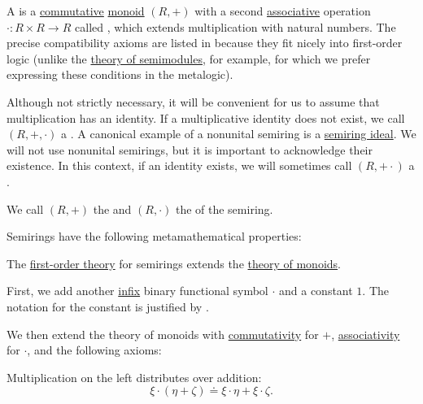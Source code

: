 \begin{definition}\label{def:semiring}
  A  is a \hyperref[def:magma/commutative]{commutative} \hyperref[def:monoid]{monoid} \( (R, +) \) with a second \hyperref[def:magma/associative]{associative} operation \( \cdot: R \times R \to R \) called , which extends multiplication with natural numbers. The precise compatibility axioms are listed in  because they fit nicely into first-order logic (unlike the \hyperref[def:semimodule/theory]{theory of semimodules}, for example, for which we prefer expressing these conditions in the metalogic).

  Although not strictly necessary, it will be convenient for us to assume that multiplication has an identity. If a multiplicative identity does not exist, we call \( (R, +, \cdot) \) a . A canonical example of a nonunital semiring is a \hyperref[def:semiring_ideal]{semiring ideal}. We will not use nonunital semirings, but it is important to acknowledge their existence. In this context, if an identity exists, we will sometimes call \( (R, + \cdot) \) a .

  We call \( (R, +) \) the  and \( (R, \cdot) \) the  of the semiring.

  Semirings have the following metamathematical properties:
  \begin{thmenum}
     The \hyperref[def:first_order_theory]{first-order theory} for semirings extends the \hyperref[def:monoid/theory]{theory of monoids}.

    First, we add another \hyperref[rem:first_order_formula_conventions/infix]{infix} binary functional symbol \( \cdot \) and a constant \( 1 \). The notation for the constant is justified by .

    We then extend the theory of monoids with \hyperref[def:magma/commutative]{commutativity} for \( + \), \hyperref[def:magma/associative]{associativity} for \( \cdot \), and the following axioms:
    \begin{thmenum}
       Multiplication on the left distributes over addition:
      \begin{equation}\label{eq:def:semiring/left_distributivity}
        \xi \cdot (\eta + \zeta) \doteq \xi \cdot \eta + \xi \cdot \zeta.
      \end{equation}


\end{thmenum}
\end{thmenum}
\end{definition}
